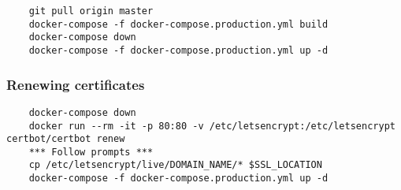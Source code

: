 \begin{verbatim}
	git pull origin master
	docker-compose -f docker-compose.production.yml build
	docker-compose down
	docker-compose -f docker-compose.production.yml up -d
\end{verbatim}

\subsubsection{Renewing certificates} \label{section:certificate-renewal}

\begin{verbatim}
	docker-compose down
	docker run --rm -it -p 80:80 -v /etc/letsencrypt:/etc/letsencrypt certbot/certbot renew
	*** Follow prompts ***
	cp /etc/letsencrypt/live/DOMAIN_NAME/* $SSL_LOCATION
	docker-compose -f docker-compose.production.yml up -d
\end{verbatim}
